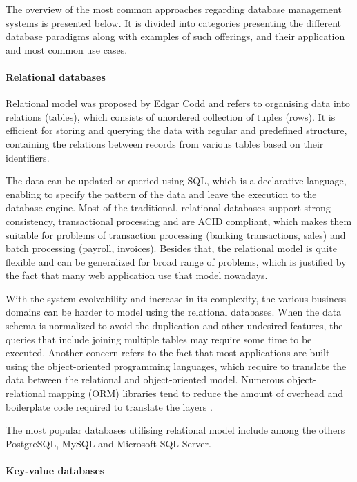 The overview of the most common approaches regarding database management systems is presented below. It is divided into categories presenting the different database paradigms along with examples of such offerings, and their application and most common use cases.

\paragraph{Relational databases}

Relational model was proposed by Edgar Codd and refers to organising data into relations (tables), which consists of unordered collection of tuples (rows). It is efficient for storing and querying the data with regular and predefined structure, containing the relations between records from various tables based on their identifiers.

The data can be updated or queried using SQL, which is a declarative language, enabling to specify the pattern of the data and leave the execution to the database engine. Most of the traditional, relational databases support strong consistency, transactional processing and are ACID compliant, which makes them suitable for problems of transaction processing (banking transactions, sales) and batch processing (payroll, invoices). Besides that, the relational model is quite flexible and can be generalized for broad range of problems, which is justified by the fact that many web application use that model nowadays.

With the system evolvability and increase in its complexity, the various business domains can be harder to model using the relational databases. When the data schema is normalized to avoid the duplication and other undesired features, the queries that include joining multiple tables may require some time to be executed. Another concern refers to the fact that most applications are built using the object-oriented programming languages, which require to translate the data between the relational and object-oriented model. Numerous object-relational mapping (ORM) libraries tend to reduce the amount of overhead and boilerplate code required to translate the layers \cite{DesignDataIntensiveApplications}.

The most popular databases utilising relational model include among the others PostgreSQL, MySQL and Microsoft SQL Server.

\paragraph{Key-value databases}

